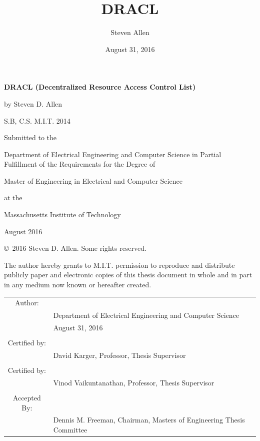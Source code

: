 \documentclass[pdftex,12pt,a4papaer,twoside,notitlepage]{report}
\title{DRACL}
\author{Steven Allen}
\date{August 31, 2016}
\begin{document}
\makeatletter
\def\footnoterule{\kern 12\p@
  \hrule \@width 2in \kern 7.6\p@} %
\makeatother


\begin{titlingpage}

  \begin{singlespacing}

    \setlength{\parskip}{1em}
    \begin{center}

      \textbf{DRACL (Decentralized Resource Access Control List)}

      by Steven D. Allen

      S.B, C.S. M.I.T. 2014

      \vspace{2em}

      Submitted to the

      Department of Electrical Engineering and Computer Science in
      Partial Fulfillment of the Requirements for the Degree of

      Master of Engineering in Electrical and Computer Science

      at the

      Massachusetts Institute of Technology

      August 2016

      \copyright~2016 Steven D. Allen. Some rights reserved.

      The author hereby grants to M.I.T. permission to reproduce and distribute
      publicly paper and electronic copies of this thesis document in whole and in
      part in any medium now known or hereafter created.

      \vspace{3em}
      \begin{tabular}{c l}
        Author: & \hrulefill \\
                & {\small Department of Electrical Engineering and Computer Science } \\
                & {\small August 31, 2016 } \\
        \\
        Certified by: & \hrulefill \\
                & {\small David Karger, Professor, Thesis Supervisor } \\
        \\
        Certified by: & \hrulefill \\
                & {\small Vinod Vaikuntanathan, Professor, Thesis Supervisor } \\
        \\
        Accepted By: & \hrulefill \\
                & {\small Dennis M. Freeman, Chairman, Masters of Engineering Thesis Committee } \\
      \end{tabular}
    \end{center}

  \end{singlespacing}

\end{titlingpage}
\end{document}
